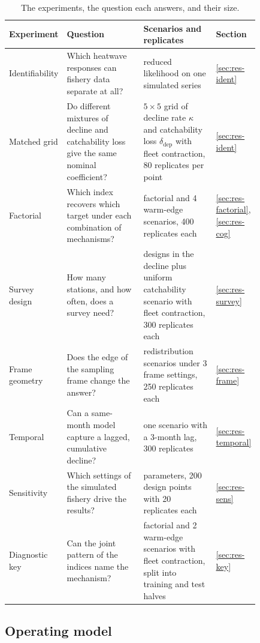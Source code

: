 \documentclass[11pt,a4paper]{article}
\newcommand{\vt}[1]{\text{#1}}
\begin{document}
\begin{table}[tbp]
\centering\footnotesize
\caption{The experiments, the question each answers, and their size.}
\label{tab:experiments}
\begin{tabular}{@{}>{\raggedright\arraybackslash}p{0.16\linewidth}>{\raggedright\arraybackslash}p{0.35\linewidth}>{\raggedright\arraybackslash}p{0.32\linewidth}l@{}}
\toprule
Experiment & Question & Scenarios and replicates & Section \\
\midrule
Identifiability & Which heatwave responses can fishery data separate at all? & reduced likelihood on one simulated series & \ref{sec:res-ident} \\
Matched grid & Do different mixtures of decline and catchability loss give the same nominal coefficient? & $5\times5$ grid of decline rate $\kappa$ and catchability loss $\delta_{\vt{dep}}$ with fleet contraction, 80 replicates per point & \ref{sec:res-ident} \\
Factorial & Which index recovers which target under each combination of mechanisms? & 16 factorial and 4 warm-edge scenarios, 400 replicates each & \ref{sec:res-factorial}, \ref{sec:res-cog} \\
Survey design & How many stations, and how often, does a survey need? & 25 designs in the decline plus uniform catchability scenario with fleet contraction, 300 replicates each & \ref{sec:res-survey} \\
Frame geometry & Does the edge of the sampling frame change the answer? & 4 redistribution scenarios under 3 frame settings, 250 replicates each & \ref{sec:res-frame} \\
Temporal & Can a same-month model capture a lagged, cumulative decline? & one scenario with a 3-month lag, 300 replicates & \ref{sec:res-temporal} \\
Sensitivity & Which settings of the simulated fishery drive the results? & 15 parameters, 200 design points with 20 replicates each & \ref{sec:res-sens} \\
Diagnostic key & Can the joint pattern of the indices name the mechanism? & 5 factorial and 2 warm-edge scenarios with fleet contraction, split into training and test halves & \ref{sec:res-key} \\
\bottomrule
\end{tabular}
\end{table}

\subsection{Operating model}
\label{sec:om}
\end{document}
